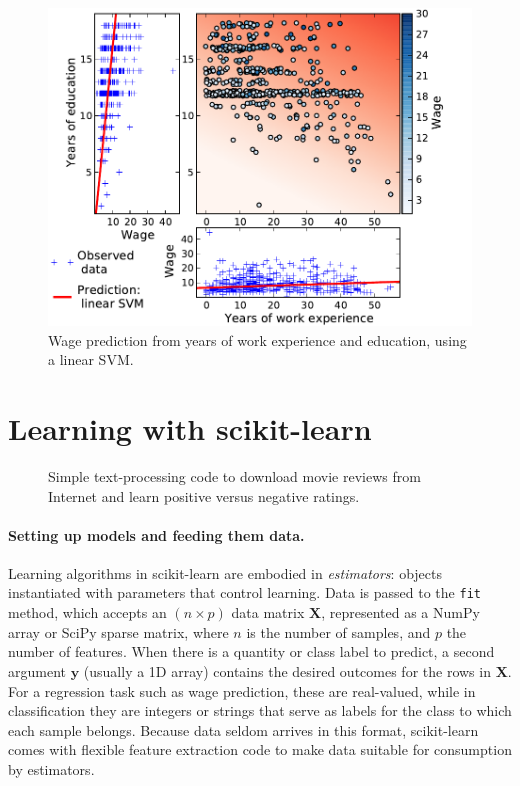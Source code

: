 \documentclass[a4paper]{article}
\begin{document}
\begin{figure}[b]
    \hspace*{-.015\linewidth}%
    \includegraphics[width=1.05\linewidth]{wage_data_linear_svm}%

    \caption{Wage prediction from years of work experience and education,
    using a linear SVM.\label{fig:linear_svm}}
\end{figure}

\section{Learning with scikit-learn}

\begin{figure}[b]

\caption{Simple text-processing code to download movie reviews from
Internet and learn positive versus negative ratings.\label{fig:code}}
\end{figure}


\paragraph{Setting up models and feeding them data.}
%
Learning algorithms in scikit-learn are embodied in \emph{estimators}:
objects instantiated with parameters that control learning.
Data is passed to the {\tt fit} method,
which accepts an $(n \times p)$ data matrix $\mathbf{X}$,
represented as a NumPy array or SciPy sparse matrix, where $n$ is the
number of samples, and $p$ the number of features.
When there is a quantity or class label to predict,
a second argument $\mathbf{y}$ (usually a 1D array)
contains the desired outcomes for the rows in $\mathbf{X}$.
For a regression task such as wage prediction, these are real-valued,
while in classification they are integers or strings that serve as labels
for the class to which each sample belongs.
Because data seldom arrives in this format,
scikit-learn comes with flexible feature extraction code
to make data suitable for consumption by estimators.
\end{document}
